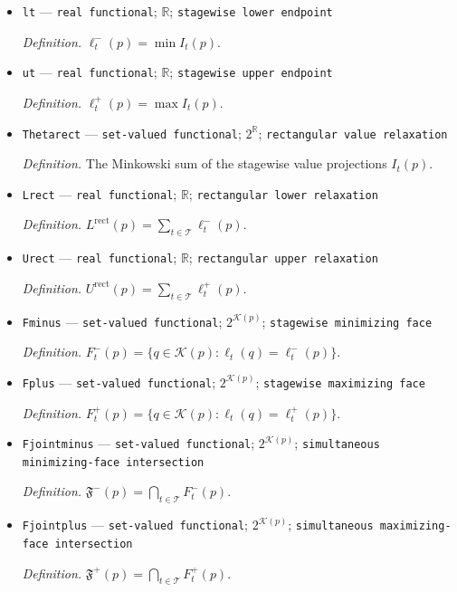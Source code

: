 \documentclass{article}
\begin{document}
\begin{itemize}
  \item \texttt{lt} --- \texttt{real functional}; \(\mathbb R\); \texttt{stagewise lower endpoint}
  \par\smallskip\noindent\emph{Definition.} \(\ell_t^-(p)=\min I_t(p)\).
  \item \texttt{ut} --- \texttt{real functional}; \(\mathbb R\); \texttt{stagewise upper endpoint}
  \par\smallskip\noindent\emph{Definition.} \(\ell_t^+(p)=\max I_t(p)\).
  \item \texttt{Thetarect} --- \texttt{set-\allowbreak{}valued functional}; \(2^{\mathbb R}\); \texttt{rectangular value relaxation}
  \par\smallskip\noindent\emph{Definition.} The Minkowski sum of the stagewise value projections \(I_t(p)\).
  \item \texttt{Lrect} --- \texttt{real functional}; \(\mathbb R\); \texttt{rectangular lower relaxation}
  \par\smallskip\noindent\emph{Definition.} \(L^{\mathrm{rect}}(p)=\sum_{t\in\mathcal T}\ell_t^-(p)\).
  \item \texttt{Urect} --- \texttt{real functional}; \(\mathbb R\); \texttt{rectangular upper relaxation}
  \par\smallskip\noindent\emph{Definition.} \(U^{\mathrm{rect}}(p)=\sum_{t\in\mathcal T}\ell_t^+(p)\).
  \item \texttt{Fminus} --- \texttt{set-\allowbreak{}valued functional}; \(2^{\mathcal K(p)}\); \texttt{stagewise minimizing face}
  \par\smallskip\noindent\emph{Definition.} \(F_t^-(p)=\{q\in\mathcal K(p):\ell_t(q)=\ell_t^-(p)\}\).
  \item \texttt{Fplus} --- \texttt{set-\allowbreak{}valued functional}; \(2^{\mathcal K(p)}\); \texttt{stagewise maximizing face}
  \par\smallskip\noindent\emph{Definition.} \(F_t^+(p)=\{q\in\mathcal K(p):\ell_t(q)=\ell_t^+(p)\}\).
  \item \texttt{Fjointminus} --- \texttt{set-\allowbreak{}valued functional}; \(2^{\mathcal K(p)}\); \texttt{simultaneous minimizing-\allowbreak{}face intersection}
  \par\smallskip\noindent\emph{Definition.} \(\mathfrak F^-(p)=\bigcap_{t\in\mathcal T}F_t^-(p)\).
  \item \texttt{Fjointplus} --- \texttt{set-\allowbreak{}valued functional}; \(2^{\mathcal K(p)}\); \texttt{simultaneous maximizing-\allowbreak{}face intersection}
  \par\smallskip\noindent\emph{Definition.} \(\mathfrak F^+(p)=\bigcap_{t\in\mathcal T}F_t^+(p)\).

\end{itemize}
\end{document}
